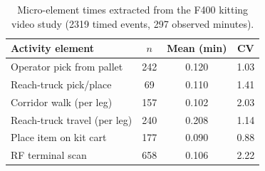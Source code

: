\begin{table}[htbp]
\centering
\caption{Micro-element times extracted from the F400 kitting video study
(2319 timed events, 297 observed minutes).}
\label{tab:timing}
\begin{tabular}{lccc}
\toprule
Activity element & $n$ & Mean (min) & CV \\
\midrule
Operator pick from pallet & 242 & 0.120 & 1.03 \\
Reach-truck pick/place & 69 & 0.110 & 1.41 \\
Corridor walk (per leg) & 157 & 0.102 & 2.03 \\
Reach-truck travel (per leg) & 240 & 0.208 & 1.14 \\
Place item on kit cart & 177 & 0.090 & 0.88 \\
RF terminal scan & 658 & 0.106 & 2.22 \\
\bottomrule
\end{tabular}
\end{table}
